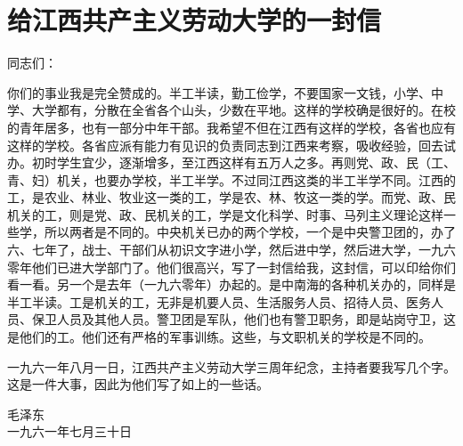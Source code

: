 \section[给江西共产主义劳动大学的一封信（一九六一年七月三十日）]{给江西共产主义劳动大学的一封信}

同志们：

你们的事业我是完全赞成的。半工半读，勤工俭学，不要国家一文钱，小学、中学、大学都有，分散在全省各个山头，少数在平地。这样的学校确是很好的。在校的青年居多，也有一部分中年干部。我希望不但在江西有这样的学校，各省也应有这样的学校。各省应派有能力有见识的负责同志到江西来考察，吸收经验，回去试办。初时学生宜少，逐渐增多，至江西这样有五万人之多。再则党、政、民（工、青、妇）机关，也要办学校，半工半学。不过同江西这类的半工半学不同。江西的工，是农业、林业、牧业这一类的工，学是农、林、牧这一类的学。而党、政、民机关的工，则是党、政、民机关的工，学是文化科学、时事、马列主义理论这样一些学，所以两者是不同的。中央机关已办的两个学校，一个是中央警卫团的，办了六、七年了，战士、干部们从初识文字进小学，然后进中学，然后进大学，一九六零年他们已进大学部门了。他们很高兴，写了一封信给我，这封信，可以印给你们看一看。另一个是去年（一九六零年）办起的。是中南海的各种机关办的，同样是半工半读。工是机关的工，无非是机要人员、生活服务人员、招待人员、医务人员、保卫人员及其他人员。警卫团是军队，他们也有警卫职务，即是站岗守卫，这是他们的工。他们还有严格的军事训练。这些，与文职机关的学校是不同的。

一九六一年八月一日，江西共产主义劳动大学三周年纪念，主持者要我写几个字。这是一件大事，因此为他们写了如上的一些话。

{\raggedleft 毛泽东\\一九六一年七月三十日\par}


